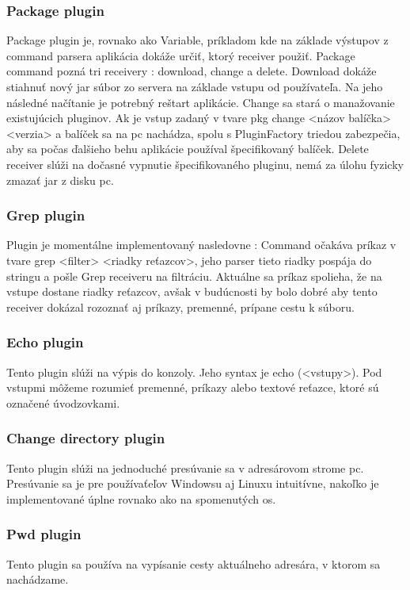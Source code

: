 {\subsubsection{Package plugin}
\indent Package plugin je, rovnako ako Variable, príkladom kde na základe výstupov z command parsera aplikácia dokáže určiť, ktorý receiver použiť. Package command pozná tri receivery : download, change a delete. Download dokáže stiahnuť nový \acrshort{jar} súbor zo servera na základe vstupu od používateľa. Na jeho následné načítanie je potrebný reštart aplikácie. Change sa stará o manažovanie existujúcich pluginov. Ak je vstup zadaný v tvare pkg change <názov balíčka> <verzia> a balíček sa na \acrshort{pc} nachádza,  spolu s PluginFactory triedou zabezpečia, aby sa počas ďalšieho behu aplikácie používal špecifikovaný balíček. Delete receiver slúži na dočasné vypnutie špecifikovaného pluginu, nemá za úlohu fyzicky zmazať \acrshort{jar} z disku \acrshort{pc}. 
\subsubsection{Grep plugin}
\indent Plugin je momentálne implementovaný nasledovne : Command očakáva príkaz v tvare grep <filter> <riadky reťazcov>, jeho parser tieto riadky pospája do stringu a pošle Grep receiveru na filtráciu. Aktuálne sa príkaz spolieha, že na vstupe dostane riadky reťazcov, avšak v budúcnosti by bolo dobré aby tento receiver dokázal rozoznať aj príkazy, premenné, prípane cestu k súboru.
\subsubsection{Echo plugin}
\indent Tento plugin slúži na výpis do konzoly. Jeho syntax je echo (<vstupy>). Pod vstupmi môžeme rozumieť premenné, príkazy alebo textové reťazce, ktoré sú označené úvodzovkami. 
\subsubsection{Change directory plugin}
\indent  Tento plugin slúži na jednoduché presúvanie sa v adresárovom strome \acrshort{pc}. Presúvanie sa je pre používaťeľov Windowsu aj Linuxu intuitívne, nakoľko je implementované úplne rovnako ako na spomenutých \acrshort{os}.
\subsubsection{Pwd plugin}
\indent  Tento plugin sa používa  na vypísanie cesty aktuálneho adresára, v ktorom sa nachádzame.
}

